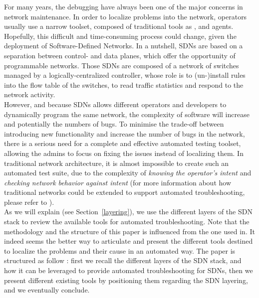 \documentclass[10pt,article]{IEEEtran}
\begin{document}
For many years, the debugging have always been one of the major concerns in network maintenance. In order to localize problems into the network, operators usually use a narrow toolset, composed of traditional tools as \verb@ping@, \verb@traceroute@ and \verb@SNMP@ agents\cite{zeng2012automatic}.\\
Hopefully, this difficult and time-consuming\cite{zeng2012automatic} process could change, given the deployment of Software-Defined Networks. In a nutshell, SDNs are based on a separation between control- and data planes, which offer the opportunity of programmable networks\cite{mckeown2008openflow}. Those SDNs are composed of a network of switches managed by a logically-centralized controller, whose role is to (un-)install rules into the flow table of the switches, to read traffic statistics and respond to the network activity.\\
However, and because SDNs allows different operators and developers to dynamically program the same network, the complexity of software will increase\cite{Sherwood:2010:PNT:1924943.1924969} and potentially the numbers of bugs.
To minimise the trade-off between introducing new functionality and  increase the number of bugs in the network, there is a serious need for a complete and effective automated testing toolset, allowing the admins to focus on fixing the issues instead of localizing them. In traditional network architecture, it is almost impossible to create such an automated test suite, due to the complexity of \textit{knowing the operator's intent} and \textit{checking network behavior against intent}\cite{Heller:2013:LSL:2491185.2491197} (for more information about how traditional networks could be extended to support automated troubleshooting, please refer to \cite{Heller:2013:LSL:2491185.2491197}).\\
As we will explain (see Section~\ref{layering}), we use the different layers of the SDN stack to review the available tools for automated troubleshooting. Note that the methodology and the structure of this paper is influenced from the one used in\cite{Heller:2013:LSL:2491185.2491197}. It indeed seems the better way to articulate and present the different tools destined to localize the problems and their cause in an automated way.
The paper is structured as follow : first we recall the different layers of the SDN stack, and how it can be leveraged to provide automated troubleshooting for SDNs, then we present different existing tools by positioning them regarding the SDN layering, and we eventually conclude.
\end{document}
